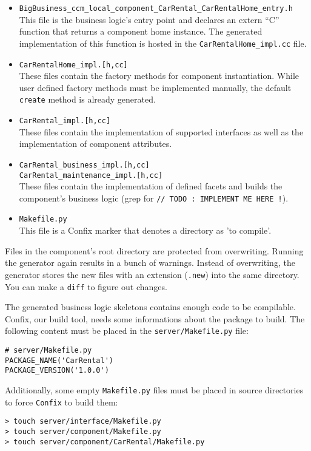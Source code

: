 \begin{itemize}
\item {\tt BigBusiness\_ccm\_local\_component\_CarRental\_CarRentalHome\_entry.h} \\
This file is the business logic's entry point and declares an extern ``C'' 
function that returns a component home instance.
The generated implementation of this function is hosted in the 
{\tt CarRentalHome\_impl.cc} file.

\item {\tt CarRentalHome\_impl.[h,cc]} \\
These files contain the factory methods for component instantiation. 
While user defined factory methods must be implemented manually, the default 
{\tt create} method is already generated.

\item {\tt CarRental\_impl.[h,cc]} \\
These files contain the implementation of supported interfaces as well as the
implementation of component attributes.

\item {\tt CarRental\_business\_impl.[h,cc]} \\
{\tt CarRental\_maintenance\_impl.[h,cc]} \\
These files contain the implementation of defined facets and builds
the component's business logic
(grep for {\tt // TODO : IMPLEMENT ME HERE !}).

\item {\tt Makefile.py} \\
This file is a Confix marker that denotes a directory as 'to compile'.
\end{itemize}

Files in the component's root directory are protected from overwriting.
Running the generator again results in a bunch of warnings. 
Instead of overwriting, the generator stores the new files with an extension 
({\tt *.new}) into the same directory.
You can make a {\tt diff} to figure out changes. 

\vspace{3mm}
The generated business logic skeletons contains enough code to be compilable.
Confix, our build tool, needs some informations about the package to build.
The following content must be placed in the {\tt server/Makefile.py} file:
\begin{small}
\begin{verbatim}
# server/Makefile.py
PACKAGE_NAME('CarRental')
PACKAGE_VERSION('1.0.0')
\end{verbatim}
\end{small}
Additionally, some empty {\tt Makefile.py} files must be placed in
source directories to force {\tt Confix} to build them:
\begin{small}
\begin{verbatim}
> touch server/interface/Makefile.py
> touch server/component/Makefile.py
> touch server/component/CarRental/Makefile.py
\end{verbatim}
\end{small}

